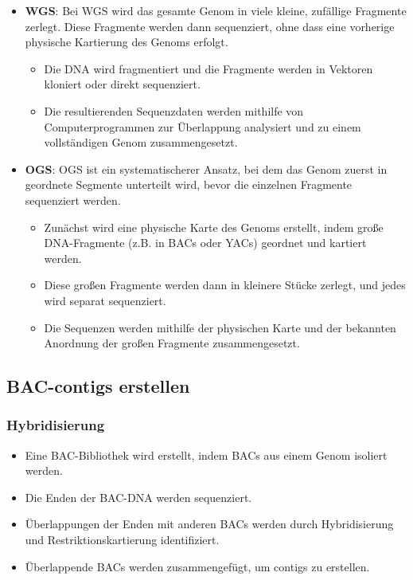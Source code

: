 \begin{mechanism}[title=Erklären Sie Whole Shotgun und Ordered Shotgun]
\begin{itemize}
    \item \textbf{WGS}: Bei WGS wird das gesamte Genom in viele kleine, zufällige Fragmente zerlegt. Diese Fragmente werden dann sequenziert, ohne dass eine vorherige physische Kartierung des Genoms erfolgt.
    \begin{itemize}
        \item Die DNA wird fragmentiert und die Fragmente werden in Vektoren kloniert oder direkt sequenziert.
        \item Die resultierenden Sequenzdaten werden mithilfe von Computerprogrammen zur Überlappung analysiert und zu einem vollständigen Genom zusammengesetzt.
    \end{itemize}
    \item \textbf{OGS}: OGS ist ein systematischerer Ansatz, bei dem das Genom zuerst in geordnete Segmente unterteilt wird, bevor die einzelnen Fragmente sequenziert werden.
    \begin{itemize}
        \item Zunächst wird eine physische Karte des Genoms erstellt, indem große DNA-Fragmente (z.B. in BACs oder YACs) geordnet und kartiert werden.
        \item Diese großen Fragmente werden dann in kleinere Stücke zerlegt, und jedes wird separat sequenziert.
        \item Die Sequenzen werden mithilfe der physischen Karte und der bekannten Anordnung der großen Fragmente zusammengesetzt.
    \end{itemize}
\end{itemize}
\end{mechanism}
\subsection{BAC-\glspl{contig} erstellen}
\subsubsection{Hybridisierung}
\begin{itemize}
    \item Eine BAC-Bibliothek wird erstellt, indem BACs aus einem Genom isoliert werden. 
    \item Die Enden der BAC-DNA werden sequenziert.
    \item Überlappungen der Enden mit anderen BACs werden durch Hybridisierung und Restriktionskartierung identifiziert.
    \item Überlappende BACs werden zusammengefügt, um \glspl{contig} zu erstellen.
\end{itemize}
